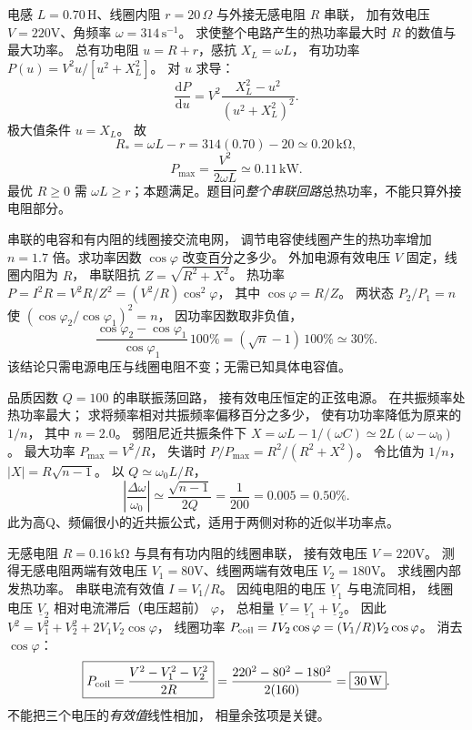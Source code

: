 电感 $L=0.70\,\mathrm H$、线圈内阻 $r=20\,\Omega$ 与外接无感电阻 $R$ 串联，
加有效电压 $V=220$V、角频率
$\omega=314\,\mathrm{s^{-1}}$。
求使整个电路产生的热功率最大时 $R$ 的数值与最大功率。
\exsolution
总有功电阻
$u=R+r$，感抗 $X_L=\omega L$，
有功功率
$P(u)=V^2u/[u^2+X_L^2]$。
对 $u$ 求导：
\[
\frac{\mathrm dP}{\mathrm du}
=V^2\frac{X_L^2-u^2}{(u^2+X_L^2)^2}.
\]
极大值条件 $u=X_L$。
故
\[
\boxed{R_*=\omega L-r
=314(0.70)-20\simeq0.20\,\mathrm{k\Omega}},
\]
\[
\boxed{P_{\max}=\frac{V^2}{2\omega L}
\simeq0.11\,\mathrm{kW}}.
\]
\excheck 最优 $R\ge0$ 需 $\omega L\ge r$；本题满足。题目问\emph{整个串联回路}总热功率，不能只算外接电阻部分。

串联的电容和有内阻的线圈接交流电网，
调节电容使线圈产生的热功率增加
$n=1.7$ 倍。求功率因数 $\cos\varphi$ 改变百分之多少。
\exsolution
外加电源有效电压 $V$ 固定，线圈内阻为 $R$，
串联阻抗
$Z=\sqrt{R^2+X^2}$。
热功率
$P=I^2R=V^2R/Z^2
=(V^2/R)\cos^2\varphi$，
其中 $\cos\varphi=R/Z$。
两状态
$P_2/P_1=n$
使
$(\cos\varphi_2/\cos\varphi_1)^2=n$，
因功率因数取非负值，
\[
\boxed{\frac{\cos\varphi_2-\cos\varphi_1}
{\cos\varphi_1}\,100\%
=(\sqrt n-1)\,100\%\simeq30\%}.
\]
\excheck 该结论只需电源电压与线圈电阻不变；无需已知具体电容值。

品质因数 $Q=100$ 的串联振荡回路，
接有效电压恒定的正弦电源。
在共振频率处热功率最大；
求将频率相对共振频率偏移百分之多少，
使有功功率降低为原来的 $1/n$，
其中 $n=2.0$。
\exsolution
弱阻尼近共振条件下
$X=\omega L-1/(\omega C)
\simeq2L(\omega-\omega_0)$。
最大功率
$P_{\max}=V^2/R$，
失谐时
$P/P_{\max}=R^2/(R^2+X^2)$。
令比值为 $1/n$，
$|X|=R\sqrt{n-1}$。
以 $Q\simeq\omega_0L/R$，
\[
\boxed{\left|\frac{\Delta\omega}{\omega_0}\right|
\simeq\frac{\sqrt{n-1}}{2Q}
=\frac1{200}=0.005=0.50\%}.
\]
\excheck 此为高Q、频偏很小的近共振公式，适用于两侧对称的近似半功率点。

无感电阻 $R=0.16\,\mathrm{k\Omega}$
与具有有功内阻的线圈串联，
接有效电压 $V=220$V。
测得无感电阻两端有效电压
$V_1=80$V、线圈两端有效电压
$V_2=180$V。
求线圈内部发热功率。
\exsolution
串联电流有效值
$I=V_1/R$。
因纯电阻的电压 $\underline V_1$ 与电流同相，
线圈电压 $\underline V_2$ 相对电流滞后（电压超前） $\varphi$，
总相量
$\underline V=\underline V_1+\underline V_2$。
因此
$V^2=V_1^2+V_2^2+2V_1V_2\cos\varphi$，
线圈功率
$P_{\rm coil}=IV_2\cos\varphi
=(V_1/R)V_2\cos\varphi$。
消去 $\cos\varphi$：
\[
\boxed{P_{\rm coil}=
\frac{V^2-V_1^2-V_2^2}{2R}}
=\frac{220^2-80^2-180^2}{2(160)}
=\boxed{30\,\mathrm W}.
\]
\excheck 不能把三个电压的\emph{有效值}线性相加，
相量余弦项是关键。


